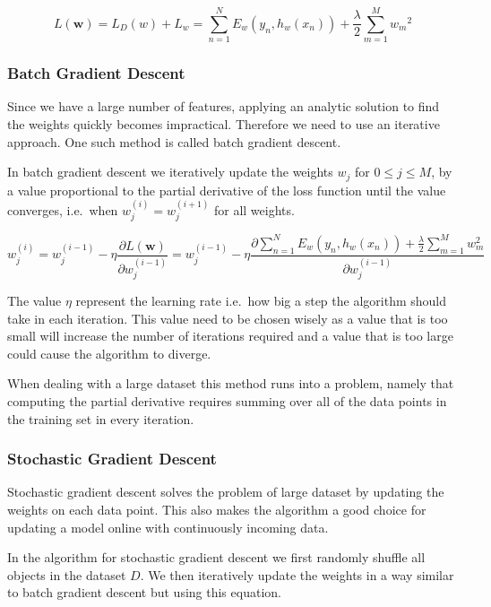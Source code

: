 \[ L(\mathbf{w})
  = L_D(w) + L_w 
  = \sum_{n=1}^N E_w(y_n, h_w(x_n)) + \frac{\lambda}{2} \sum_{m=1}^{M} {w_m}^2 \] 

\subsubsection{Batch Gradient Descent}\label{sec:batch}

Since we have a large number of features, applying an analytic solution to find the weights quickly becomes impractical.
Therefore we need to use an iterative approach.
One such method is called batch gradient descent.

In batch gradient descent we iteratively update the weights $w_j$ for $0 \leq j \leq M$, by a value proportional to the partial derivative of the loss function until the value converges, i.e.\ when $w_{j}^{(i)} = w_j^{(i+1)}$ for all weights.


\[ w_j^{(i)} = w_j^{(i-1)} - \eta \frac{\partial L(\textbf{w})}{\partial w_j^{(i-1)}}
       = w_{j}^{(i-1)} - \eta \frac{\partial \sum_{n=1}^N E_w(y_n, h_w(x_n)) + \frac{\lambda}{2}\sum_{m=1}^M w_m^2}{\partial w_j^{(i-1)}} \]  

The value $\eta$ represent the learning rate i.e.\ how big a step the algorithm should take in each iteration.
This value need to be chosen wisely as a value that is too small will increase the number of iterations required and a value that is too large could cause the algorithm to diverge.

When dealing with a large dataset this method runs into a problem, namely that computing the partial derivative requires summing over all of the data points in the training set in every iteration. 

\subsubsection{Stochastic Gradient Descent}\label{sec:stochastic}

Stochastic gradient descent solves the problem of large dataset by updating the weights on each data point.
This also makes the algorithm a good choice for updating a model online with continuously incoming data. 

In the algorithm for stochastic gradient descent we first randomly shuffle all objects in the dataset $D$.
We then iteratively update the weights in a way similar to batch gradient descent but using this equation.

